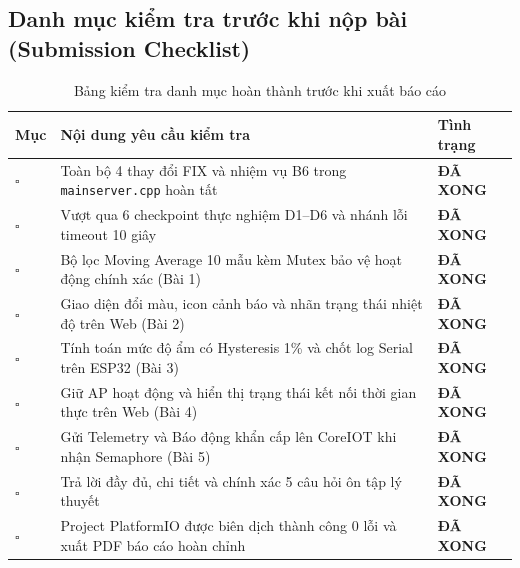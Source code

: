 \subsection{Danh mục kiểm tra trước khi nộp bài (Submission Checklist)}
\begin{table}[H]
\centering
\begin{tabularx}{\textwidth}{|>{\centering\arraybackslash}m{1.5cm}|m{10.5cm}|>{\centering\arraybackslash}X|}
\hline
\rowcolor{codeframe!40}
\textbf{Mục} & \textbf{Nội dung yêu cầu kiểm tra} & \textbf{Tình trạng} \\
\hline
$\square$ & Toàn bộ 4 thay đổi FIX và nhiệm vụ B6 trong \texttt{mainserver.cpp} hoàn tất & \textbf{ĐÃ XONG} \\
\hline
$\square$ & Vượt qua 6 checkpoint thực nghiệm D1--D6 và nhánh lỗi timeout 10 giây & \textbf{ĐÃ XONG} \\
\hline
$\square$ & Bộ lọc Moving Average 10 mẫu kèm Mutex bảo vệ hoạt động chính xác (Bài 1) & \textbf{ĐÃ XONG} \\
\hline
$\square$ & Giao diện đổi màu, icon cảnh báo và nhãn trạng thái nhiệt độ trên Web (Bài 2) & \textbf{ĐÃ XONG} \\
\hline
$\square$ & Tính toán mức độ ẩm có Hysteresis 1\% và chốt log Serial trên ESP32 (Bài 3) & \textbf{ĐÃ XONG} \\
\hline
$\square$ & Giữ AP hoạt động và hiển thị trạng thái kết nối thời gian thực trên Web (Bài 4) & \textbf{ĐÃ XONG} \\
\hline
$\square$ & Gửi Telemetry và Báo động khẩn cấp lên CoreIOT khi nhận Semaphore (Bài 5) & \textbf{ĐÃ XONG} \\
\hline
$\square$ & Trả lời đầy đủ, chi tiết và chính xác 5 câu hỏi ôn tập lý thuyết & \textbf{ĐÃ XONG} \\
\hline
$\square$ & Project PlatformIO được biên dịch thành công 0 lỗi và xuất PDF báo cáo hoàn chỉnh & \textbf{ĐÃ XONG} \\
\hline
\end{tabularx}
\caption{Bảng kiểm tra danh mục hoàn thành trước khi xuất báo cáo}
\label{tab:checklist}
\end{table}
